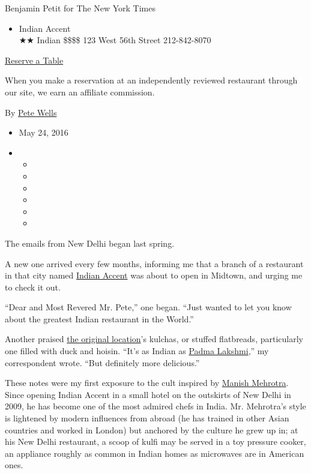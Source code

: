 Benjamin Petit for The New York Times

\begin{itemize}
\tightlist
\item
  Indian Accent\\
  ★★ Indian \$\$\$\$ 123 West 56th Street 212-842-8070
\end{itemize}

\href{http://www.opentable.com/single.aspx?ref=4201\&rid=193822}{Reserve
a Table}

When you make a reservation at an independently reviewed restaurant
through our site, we earn an affiliate commission.

By \href{http://www.nytimes3xbfgragh.onion/by/pete-wells}{Pete Wells}

\begin{itemize}
\item
  May 24, 2016
\item
  \begin{itemize}
  \item
  \item
  \item
  \item
  \item
  \item
  \end{itemize}
\end{itemize}

The emails from New Delhi began last spring.

A new one arrived every few months, informing me that a branch of a
restaurant in that city named
\href{http://www.indianaccent.com/newyork/index.html}{Indian Accent} was
about to open in Midtown, and urging me to check it out.

``Dear and Most Revered Mr. Pete,'' one began. ``Just wanted to let you
know about the greatest Indian restaurant in the World.''

Another praised
\href{http://www.indianaccent.com/newdelhi/index.html}{the original
location}'s kulchas, or stuffed flatbreads, particularly one filled with
duck and hoisin. ``It's as Indian as
\href{http://www.bravotv.com/people/padma-lakshmi}{Padma Lakshmi},'' my
correspondent wrote. ``But definitely more delicious.''

These notes were my first exposure to the cult inspired by
\href{https://www.youtube.com/watch?v=M-lu29IkZ1w}{Manish Mehrotra}.
Since opening Indian Accent in a small hotel on the outskirts of New
Delhi in 2009, he has become one of the most admired chefs in India. Mr.
Mehrotra's style is lightened by modern influences from abroad (he has
trained in other Asian countries and worked in London) but anchored by
the culture he grew up in; at his New Delhi restaurant, a scoop of kulfi
may be served in a toy pressure cooker, an appliance roughly as common
in Indian homes as microwaves are in American ones.

